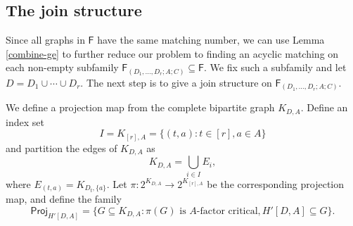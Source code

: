 \documentclass[10pt]{amsart}
\theoremstyle{definition}
\begin{document}
	\subsection*{The join structure}
	Since all graphs in $\mathsf{F}$ have the same matching number, we can use Lemma \ref{combine-ge} to further reduce our problem to finding an acyclic matching on each non-empty subfamily $\mathsf{F}_{(D_1, \dots, D_r; A; C)} \subseteq \mathsf{F}$. We fix such a subfamily and let $D = D_1\cup \cdots \cup D_r$. The next step is to give a join structure on  $\mathsf{F}_{(D_1, \dots, D_r; A; C)}$.
	
	\medskip
	
	
	We define a projection map from the complete bipartite graph $K_{D, A}$. Define an index set \[I = K_{[r], A} = \{(t,a) : t\in [r], a\in A\}\] and partition the edges of $K_{D,A}$ as 
	\[K_{D,A} = \textstyle{\bigcup}_{i\in I} E_i, \]
	where $E_{(t, a)} = K_{D_t, \{a\}}$. Let $\pi: 2^{K_{D,A}} \to 2^{K_{[r], A}}$ be the corresponding  projection map,
	and define the family
	\[\mathsf{Proj}_{H'[D,A]} = \{G\subseteq K_{D,A} : \pi(G) \text{ is $A$-factor critical}, H'[D,A]\subseteq G \}. \]
	
\end{document}
